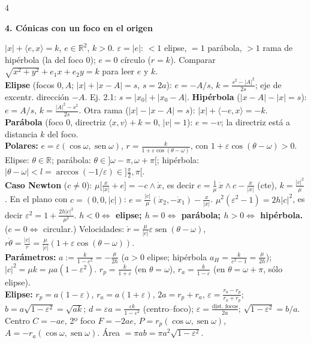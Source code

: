 \documentclass[8pt,a4paper,landscape]{extarticle}
\newcommand{\ip}[2]{\langle #1,#2\rangle}
\newcommand{\ab}[1]{\lvert #1\rvert}
\newcommand{\wg}{\wedge}
\newcommand{\xd}{\dot x}
\newcommand{\R}{\mathbb{R}}
\newcommand{\rper}{r_{p}}
\newcommand{\rapo}{r_{a}}
\DeclareMathOperator{\sen}{sen}
\newcommand{\seccion}[1]{\par\vspace{1.5pt}\noindent\colorbox{blue!12}{\parbox{\dimexpr\linewidth-2\fboxsep\relax}{\textbf{\textcolor{NavyBlue}{#1}}}}\par\vspace{0.5pt}}
\begin{document}
\begin{multicols}{4}
\seccion{4. Cónicas con un foco en el origen}
$\boxed{\ab x+\ip ex=k}$, $e\in\R^2$, $k>0$. $\varepsilon=\ab e$: $<1$ elipse, $=1$ parábola, $>1$ rama de hipérbola (la del foco 0); $e=0$ círculo ($r=k$).
Comparar $\sqrt{x^2+y^2}+e_1x+e_2y=k$ para leer $e$ y $k$.\\%
\textbf{Elipse} (focos $0,A$; $\ab x+\ab{x-A}=s$, $s=2a$): $e=-A/s$, $k=\frac{s^2-\ab A^2}{2s}$; eje de excentr. dirección $-A$. Ej. 2.1: $s=\ab{x_0}+\ab{x_0-A}$.
\textbf{Hipérbola} ($\ab{x-A}-\ab x=s$): $e=A/s$, $k=\frac{\ab A^2-s^2}{2s}$. Otra rama ($\ab x-\ab{x-A}=s$): $\ab x+\ip{-e}{x}=-k$.
\textbf{Parábola} (foco 0, directriz $\ip xv+k=0$, $\ab v=1$): $e=-v$; la directriz está a distancia $k$ del foco.\\
\textbf{Polares:} $e=\varepsilon(\cos\omega,\sen\omega)$, $r=\frac{k}{1+\varepsilon\cos(\theta-\omega)}$, con $1+\varepsilon\cos(\theta-\omega)>0$. Elipse: $\theta\in\R$; parábola: $\theta\in]\omega-\pi,\omega+\pi[$; hipérbola: $\ab{\theta-\omega}<l=\arccos(-1/\varepsilon)\in]\frac\pi2,\pi[$.\\
\textbf{Caso Newton} ($c\ne0$): $\mu\big[\frac{x}{\ab x}+e\big]=-c\wg\xd$, es decir
$\boxed{e=\frac1\mu\,\xd\wg c-\frac{x}{\ab x}}$ (cte), $k=\frac{\ab c^2}{\mu}$. En el plano con $c=(0,0,\ab c)$: $e=\frac{\ab c}{\mu}(\dot x_2,-\dot x_1)-\frac x{\ab x}$.
$\boxed{\mu^2(\varepsilon^2-1)=2h\ab c^2}$, es decir $\varepsilon^2=1+\frac{2h\ab c^2}{\mu^2}$. \textbf{$h<0\iff$ elipse; $h=0\iff$ parábola; $h>0\iff$ hipérbola.} ($e=0\iff$ circular.)
Velocidades: $\dot r=\frac\mu{\ab c}\varepsilon\sen(\theta-\omega)$, $r\dot\theta=\frac{\ab c}{r}=\frac\mu{\ab c}(1+\varepsilon\cos(\theta-\omega))$.\\
\textbf{Parámetros:} $a:=\frac{k}{1-\varepsilon^2}=-\frac{\mu}{2h}$ ($a>0$ elipse; hipérbola $a_H=\frac{k}{\varepsilon^2-1}=\frac{\mu}{2h}$); $\ab c^2=\mu k=\mu a(1-\varepsilon^2)$.
$\rper=\frac{k}{1+\varepsilon}$ (en $\theta=\omega$), $\rapo=\frac{k}{1-\varepsilon}$ (en $\theta=\omega+\pi$, sólo elipse).\\
\textbf{Elipse:} $\rper=a(1-\varepsilon)$, $\rapo=a(1+\varepsilon)$, $2a=\rper+\rapo$, $\varepsilon=\frac{\rapo-\rper}{\rapo+\rper}$; $b=a\sqrt{1-\varepsilon^2}=\sqrt{ak}$; $d=\varepsilon a=\frac{\varepsilon k}{1-\varepsilon^2}$ (centro–foco); $\varepsilon=\frac{\text{dist. focos}}{2a}$; $\sqrt{1-\varepsilon^2}=b/a$. Centro $C=-ae$, 2º foco $F=-2ae$, $P=\rper(\cos\omega,\sen\omega)$, $A=-\rapo(\cos\omega,\sen\omega)$. Área $=\pi ab=\pi a^2\sqrt{1-\varepsilon^2}$.\\

\end{multicols}
\end{document}
